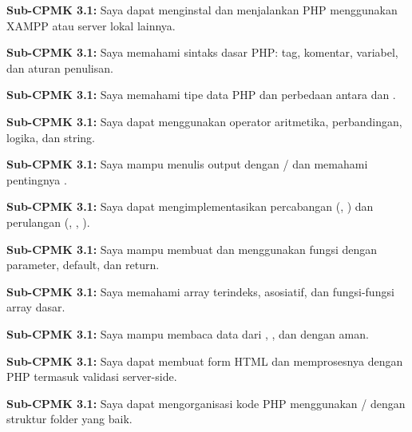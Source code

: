 \documentclass[../main.tex]{subfiles}
\begin{document}
\begin{checklist}
  \item \textbf{Sub-CPMK 3.1:} Saya dapat menginstal dan menjalankan PHP menggunakan XAMPP atau server lokal lainnya.
  \item \textbf{Sub-CPMK 3.1:} Saya memahami sintaks dasar PHP: tag, komentar, variabel, dan aturan penulisan.
  \item \textbf{Sub-CPMK 3.1:} Saya memahami tipe data PHP dan perbedaan antara \code{==} dan \code{===}.
  \item \textbf{Sub-CPMK 3.1:} Saya dapat menggunakan operator aritmetika, perbandingan, logika, dan string.
  \item \textbf{Sub-CPMK 3.1:} Saya mampu menulis output dengan / dan memahami pentingnya .
  \item \textbf{Sub-CPMK 3.1:} Saya dapat mengimplementasikan percabangan (, ) dan perulangan (, , ).
  \item \textbf{Sub-CPMK 3.1:} Saya mampu membuat dan menggunakan fungsi dengan parameter, default, dan return.
  \item \textbf{Sub-CPMK 3.1:} Saya memahami array terindeks, asosiatif, dan fungsi-fungsi array dasar.
  \item \textbf{Sub-CPMK 3.1:} Saya mampu membaca data dari , , dan  dengan aman.
  \item \textbf{Sub-CPMK 3.1:} Saya dapat membuat form HTML dan memprosesnya dengan PHP termasuk validasi server-side.
  \item \textbf{Sub-CPMK 3.1:} Saya dapat mengorganisasi kode PHP menggunakan / dengan struktur folder yang baik.
\end{checklist}
\end{document}

